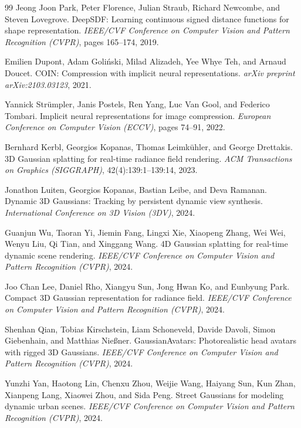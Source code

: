 \documentclass[11pt,a4paper]{article}
\begin{document}
\begin{thebibliography}{99}
Jeong Joon Park, Peter Florence, Julian Straub, Richard Newcombe, and Steven Lovegrove.
DeepSDF: Learning continuous signed distance functions for shape representation.
\textit{IEEE/CVF Conference on Computer Vision and Pattern Recognition (CVPR)}, pages 165--174, 2019.

Emilien Dupont, Adam Goli\'nski, Milad Alizadeh, Yee Whye Teh, and Arnaud Doucet.
COIN: Compression with implicit neural representations.
\textit{arXiv preprint arXiv:2103.03123}, 2021.

Yannick Str\"umpler, Janis Postels, Ren Yang, Luc Van Gool, and Federico Tombari.
Implicit neural representations for image compression.
\textit{European Conference on Computer Vision (ECCV)}, pages 74--91, 2022.

Bernhard Kerbl, Georgios Kopanas, Thomas Leimk\"uhler, and George Drettakis.
3D Gaussian splatting for real-time radiance field rendering.
\textit{ACM Transactions on Graphics (SIGGRAPH)}, 42(4):139:1--139:14, 2023.

Jonathon Luiten, Georgios Kopanas, Bastian Leibe, and Deva Ramanan.
Dynamic 3D Gaussians: Tracking by persistent dynamic view synthesis.
\textit{International Conference on 3D Vision (3DV)}, 2024.

Guanjun Wu, Taoran Yi, Jiemin Fang, Lingxi Xie, Xiaopeng Zhang, Wei Wei, Wenyu Liu, Qi Tian, and Xinggang Wang.
4D Gaussian splatting for real-time dynamic scene rendering.
\textit{IEEE/CVF Conference on Computer Vision and Pattern Recognition (CVPR)}, 2024.

Joo Chan Lee, Daniel Rho, Xiangyu Sun, Jong Hwan Ko, and Eunbyung Park.
Compact 3D Gaussian representation for radiance field.
\textit{IEEE/CVF Conference on Computer Vision and Pattern Recognition (CVPR)}, 2024.

Shenhan Qian, Tobias Kirschstein, Liam Schoneveld, Davide Davoli, Simon Giebenhain, and Matthias Nie{\ss}ner.
GaussianAvatars: Photorealistic head avatars with rigged 3D Gaussians.
\textit{IEEE/CVF Conference on Computer Vision and Pattern Recognition (CVPR)}, 2024.

Yunzhi Yan, Haotong Lin, Chenxu Zhou, Weijie Wang, Haiyang Sun, Kun Zhan, Xianpeng Lang, Xiaowei Zhou, and Sida Peng.
Street Gaussians for modeling dynamic urban scenes.
\textit{IEEE/CVF Conference on Computer Vision and Pattern Recognition (CVPR)}, 2024.


\end{thebibliography}
\end{document}
